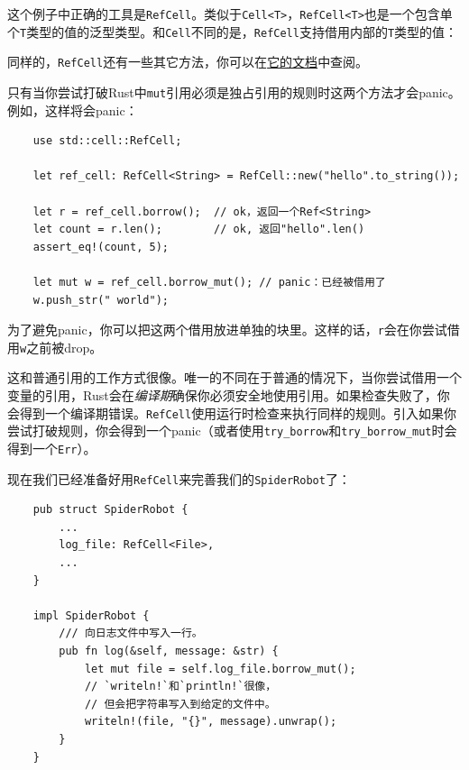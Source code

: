 这个例子中正确的工具是\texttt{RefCell}。类似于\texttt{Cell<T>}，\texttt{RefCell<T>}也是一个包含单个\texttt{T}类型的值的泛型类型。和\texttt{Cell}不同的是，\texttt{RefCell}支持借用内部的\texttt{T}类型的值：





同样的，\texttt{RefCell}还有一些其它方法，你可以在\href{https://doc.rust-lang.org/std/cell/struct.RefCell.html}{它的文档}中查阅。

只有当你尝试打破Rust中\texttt{mut}引用必须是独占引用的规则时这两个方法才会panic。例如，这样将会panic：
\begin{verbatim}
    use std::cell::RefCell;

    let ref_cell: RefCell<String> = RefCell::new("hello".to_string());

    let r = ref_cell.borrow();  // ok，返回一个Ref<String>
    let count = r.len();        // ok, 返回"hello".len()
    assert_eq!(count, 5);       

    let mut w = ref_cell.borrow_mut(); // panic：已经被借用了
    w.push_str(" world");
\end{verbatim}

为了避免panic，你可以把这两个借用放进单独的块里。这样的话，\texttt{r}会在你尝试借用\texttt{w}之前被drop。

这和普通引用的工作方式很像。唯一的不同在于普通的情况下，当你尝试借用一个变量的引用，Rust会在\emph{编译期}确保你必须安全地使用引用。如果检查失败了，你会得到一个编译期错误。\texttt{RefCell}使用运行时检查来执行同样的规则。引入如果你尝试打破规则，你会得到一个panic（或者使用\texttt{try\_borrow}和\texttt{try\_borrow\_mut}时会得到一个\texttt{Err}）。

现在我们已经准备好用\texttt{RefCell}来完善我们的\texttt{SpiderRobot}了：
\begin{verbatim}
    pub struct SpiderRobot {
        ...
        log_file: RefCell<File>,
        ...
    }

    impl SpiderRobot {
        /// 向日志文件中写入一行。
        pub fn log(&self, message: &str) {
            let mut file = self.log_file.borrow_mut();
            // `writeln!`和`println!`很像，
            // 但会把字符串写入到给定的文件中。
            writeln!(file, "{}", message).unwrap();
        }
    }
\end{verbatim}

